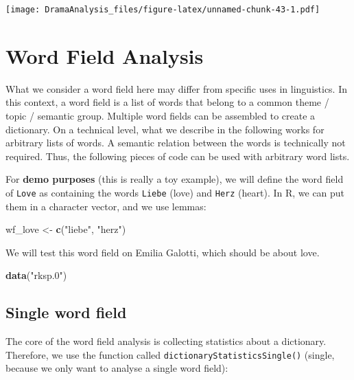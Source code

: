 \documentclass[]{book}
\newenvironment{Shaded}{\begin{snugshade}}{\end{snugshade}}
\newcommand{\KeywordTok}[1]{\textcolor[rgb]{0.13,0.29,0.53}{\textbf{#1}}}
\newcommand{\NormalTok}[1]{#1}
\newcommand{\StringTok}[1]{\textcolor[rgb]{0.31,0.60,0.02}{#1}}
\begin{document}
\texttt{[image: DramaAnalysis\_files/figure-latex/unnamed-chunk-43-1.pdf]}

\hypertarget{word-field-analysis}{%
\chapter{Word Field Analysis}\label{word-field-analysis}}

What we consider a word field here may differ from specific uses in linguistics. In this context, a word field is a list of words that belong to a common theme / topic / semantic group. Multiple word fields can be assembled to create a dictionary. On a technical level, what we describe in the following works for arbitrary lists of words. A semantic relation between the words is technically not required. Thus, the following pieces of code can be used with arbitrary word lists.

For \textbf{demo purposes} (this is really a toy example), we will define the word field of \texttt{Love} as containing the words \texttt{Liebe} (love) and \texttt{Herz} (heart).
In R, we can put them in a character vector, and we use lemmas:

\begin{Shaded}
\begin{Highlighting}[]
\NormalTok{wf_love <-}\StringTok{ }\KeywordTok{c}\NormalTok{(}\StringTok{"liebe"}\NormalTok{, }\StringTok{"herz"}\NormalTok{)}
\end{Highlighting}
\end{Shaded}

We will test this word field on Emilia Galotti, which should be about love.

\begin{Shaded}
\begin{Highlighting}[]
\KeywordTok{data}\NormalTok{(}\StringTok{"rksp.0"}\NormalTok{)}
\end{Highlighting}
\end{Shaded}

\hypertarget{single-word-field}{%
\section{Single word field}\label{single-word-field}}

The core of the word field analysis is collecting statistics about a dictionary. Therefore, we use the function called \texttt{dictionaryStatisticsSingle()} (single, because we only want to analyse a single word field):
\end{document}
